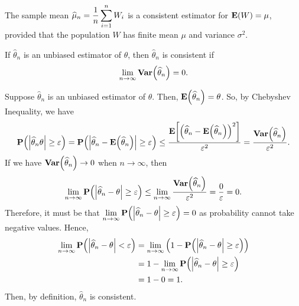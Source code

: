 \begin{cor}{}
	The sample mean $\widehat\mu_n=\dfrac{1}{n}\displaystyle\sum_{i=1}^nW_i$ is a consistent estimator for $\vb{E}(W)=\mu$, provided that the population $W$ has finite mean $\mu$ and variance $\sigma^2$.	
\end{cor}
\begin{prop}{}
	If $\hat\theta_n$ is an unbiased estimator of $\theta$, then $\hat\theta_n$ is consistent if \[\lim_{n\to\infty}\vb{Var}\qty(\widehat\theta_n)=0.\]	
\end{prop}
\begin{prf}
	Suppose $\hat\theta_n$ is an unbiased estimator of $\theta$. Then, $\vb{E}\qty(\widehat\theta_n)=\theta$. So, by Chebyshev Inequality, we have \[\vb{P}\qty(\abs{\widehat\theta_n\theta}\geq\varepsilon)=\vb{P}\qty(\abs{\widehat\theta_n-\vb{E}\qty(\widehat\theta_n)}\geq\varepsilon)\leq\dfrac{\vb{E}\qty[\qty(\widehat\theta_n-\vb{E}\qty(\widehat\theta_n))^2]}{\varepsilon^2}=\dfrac{\vb{Var}\qty(\widehat\theta_n)}{\varepsilon^2}.\] If we have $\vb{Var}\qty(\widehat\theta_n)\to0$ when $n\to\infty$, then \[\lim_{n\to\infty}\vb{P}\qty(\abs{\widehat\theta_n-\theta}\geq\varepsilon)\leq\lim_{n\to\infty}\dfrac{\vb{Var}\qty(\widehat\theta_n)}{\varepsilon^2}=\dfrac{0}{\varepsilon}=0.\] Therefore, it must be that $\displaystyle\lim_{n\to\infty}\vb{P}\qty(\abs{\widehat\theta_n-\theta}\geq\varepsilon)=0$ as probability cannot take negative values. Hence, \begin{align*}\lim_{n\to\infty}\vb{P}\qty(\abs{\widehat\theta_n-\theta}<\varepsilon)&=\lim_{n\to\infty}\qty(1-\vb{P}\qty(\abs{\widehat\theta_n-\theta}\geq\varepsilon))\\&=1-\lim_{n\to\infty}\vb{P}\qty(\abs{\widehat\theta_n-\theta}\geq\varepsilon)\\&=1-0=1.\end{align*} Then, by definition, $\hat\theta_n$ is consistent. 
\end{prf}

